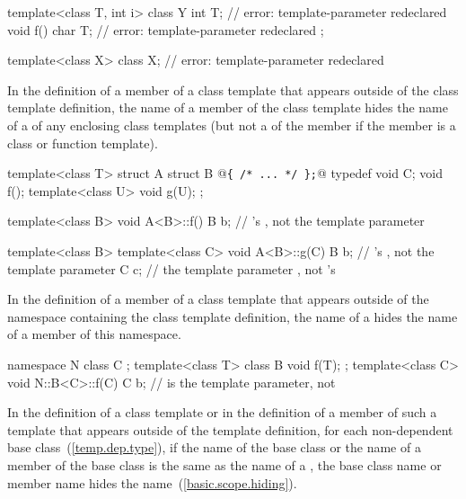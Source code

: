 \begin{codeblock}
template<class T, int i> class Y {
  int T;            // error: template-parameter redeclared
  void f() {
    char T;         // error: template-parameter redeclared
  }
};

template<class X> class X;      // error: template-parameter redeclared
\end{codeblock}
\exitexample

\pnum
In the definition of a member of
a class template that appears outside of the class template definition,
the name of a member of the class template hides the name of a
of any enclosing class templates (but not a  of the
member if the member is a class or function template).
\enterexample

\begin{codeblock}
template<class T> struct A {
  struct B @\texttt{\{ /* ... */ \};}@
  typedef void C;
  void f();
  template<class U> void g(U);
};

template<class B> void A<B>::f() {
  B b;              // 's , not the template parameter
}

template<class B> template<class C> void A<B>::g(C) {
  B b;              // 's , not the template parameter
  C c;              // the template parameter , not 's 
}
\end{codeblock}
\exitexample

\pnum
In the definition of a member of a class template that appears outside of the
namespace containing the class template definition,
the name of a
hides the name of a member of this namespace.
\enterexample

\begin{codeblock}
namespace N {
  class C { };
  template<class T> class B {
    void f(T);
  };
}
template<class C> void N::B<C>::f(C) {
  C b;              //  is the template parameter, not 
}
\end{codeblock}
\exitexample

\pnum
In the definition of a class template or in the definition of a member of such
a template that appears outside of the template definition,
for each non-dependent base class~(\ref{temp.dep.type}),
if the name of the base class
or the name of a member of the
base class is the same as the name of a
,
the base class name or member name hides the
name~(\ref{basic.scope.hiding}).
\enterexample

